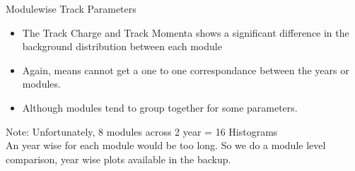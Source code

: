 \begin{frame}{Modulewise Track Parameters}
    
    \begin{itemize}
        \item The Track Charge and Track Momenta shows a significant difference in the background distribution between each module
        \item Again, means cannot get a one to one correspondance between the years or modules.
        \item Although modules tend to group together for some parameters.
    \end{itemize}
    \vspace{0.3 cm}
    \small{    
    Note: Unfortunately, 8 modules across 2 year = 16 Histograms \\
    An year wise for each module would be too long.
    So we do a module level comparison, year wise plots available in the backup.
    }
\end{frame}




